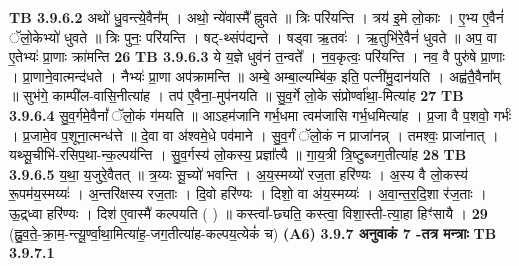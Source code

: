 \documentclass[17pt]{extarticle}
\begin{document}
{{{{{{{{{{{{{{{{{{{{{{                  \newline
                                \textbf{ TB 3.9.6.2} \newline
                  अथो॑ धु॒वन्त्ये॒वैन᳚म् । अथो॒ न्ये॑वास्मै᳚ ह्नुवते ॥ त्रिः परि॑यन्ति । त्रय॑ इ॒मे लो॒काः । ए॒भ्य ए॒वैनं॑ ॅलो॒केभ्यो॑ धुवते ॥ त्रिः पुनः॒ परि॑यन्ति । षट्-थ्संप॑द्यन्ते । षड्वा ऋ॒तवः॑ । ऋ॒तुभि॑रे॒वैनं॑ धुवते ॥ अप॒ वा ए॒तेभ्यः॑ प्रा॒णाः क्रा॑मन्ति \textbf{ 26} \newline
                  \newline
                                \textbf{ TB 3.9.6.3} \newline
                  ये य॒ज्ञे धुव॑नं त॒न्वते᳚ । न॒व॒कृत्वः॒ परि॑यन्ति । नव॒ वै पुरु॑षे प्रा॒णाः । प्रा॒णाने॒वात्मन्द॑धते । नैभ्यः॑ प्रा॒णा अप॑क्रामन्ति ॥ अम्बे॒ अम्बा॒ल्यम्बि॑क॒ इति॒ पत्नी॑मु॒दान॑यति । अह्व॑तै॒वैना᳚म् ॥ सुभ॑गे॒ काम्पी॑ल-वासि॒नीत्या॑ह । तप॑ ए॒वैना॒-मुप॑नयति ॥ सु॒व॒र्गे लो॒के संप्रोर्ण्वा॑था॒-मित्या॑ह \textbf{ 27} \newline
                  \newline
                                \textbf{ TB 3.9.6.4} \newline
                  सु॒व॒र्गमे॒वैनां᳚ ॅलो॒कं ग॑मयति ॥ आऽहम॑जानि गर्भ॒धमा त्वम॑जासि गर्भ॒धमित्या॑ह । प्र॒जा वै प॒शवो॒ गर्भः॑ । प्र॒जामे॒व प॒शूना॒त्मन्ध॑त्ते ॥ दे॒वा वा अ॑श्वमे॒धे पव॑माने । सु॒व॒र्गं ॅलो॒कं न प्राजा॑नन्न् । तमश्वः॒ प्राजा॑नात् । यथ्सू॒चीभि॑-रसिप॒था-न्क॒ल्पय॑न्ति । सु॒व॒र्गस्य॑ लो॒कस्य॒ प्रज्ञा᳚त्यै ॥ गा॒य॒त्री त्रि॒ष्टुब्जग॒तीत्या॑ह \textbf{ 28} \newline
                  \newline
                                \textbf{ TB 3.9.6.5} \newline
                  य॒था॒ य॒जुरे॒वैतत् ॥ त्र॒य्यः सू॒च्यो॑ भवन्ति । अ॒य॒स्मय्यो॑ रज॒ता हरि॑ण्यः । अ॒स्य वै लो॒कस्य॑ रू॒पम॑य॒स्मय्यः॑ । अ॒न्तरि॑क्षस्य रज॒ताः । दि॒वो हरि॑ण्यः । दिशो॒ वा अ॑य॒स्मय्यः॑ । अ॒वा॒न्त॒र॒दि॒शा र॑ज॒ताः । ऊ॒द्र्ध्वा हरि॑ण्यः । दिश॑ ए॒वास्मै॑ कल्पयति ( ) ॥ कस्त्वा᳚-छ्यति॒ कस्त्वा॒ विशा॒स्ती-त्या॒हा हिꣳ॑सायै । \textbf{ 29} \newline
                  \newline
                                    (ह्नु॒व॒ते॒-क्रा॒म॒-न्त्यू॒र्ण्वा॒था॒मित्या॑ह॒-जग॒तीत्या॑ह-कल्पय॒त्येकं॑ च) \textbf{(A6)} \newline \newline
                \textbf{ 3.9.7     अनुवाकं   7 -तत्र मन्त्राः} \newline
                                \textbf{ TB 3.9.7.1} \newline
}}}}}}}}}}}}}}}}}}}}}}
\end{document}
